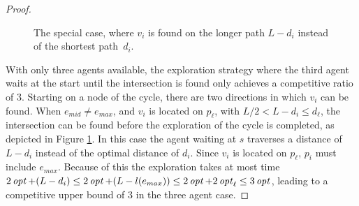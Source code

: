 \begin{proof}
\begin{figure}[H]
    \begin{center}
    \end{center}
    \caption[ALE at intersection]{The special case, where $v_i$ is found on the longer path $L-d_i$ instead of the shortest path~$d_i$.}
    \label{Case5ALE}
\end{figure}

With only three agents available, the exploration strategy where the third agent waits at the start until the intersection is found only achieves a competitive ratio of $3$. Starting on a node of the cycle, there are two directions in which $v_i$ can be found. When $e_{mid} \neq e_{max}$, and $v_i$ is located on $p_\ell$,
with $L/2 < L - d_i \leq d_\ell$, the intersection can be found before the exploration of the cycle is completed, as depicted in Figure \ref{Case5ALE}. In this case the agent waiting at $s$ traverses
a distance of $L - d_i$ instead of the optimal distance of $d_i$. Since $v_i$ is located on $p_\ell$, $p_i$ must include $e_{max}$. Because of this
the exploration takes at most time $2\mathop{\mathit{opt}}\nolimits + (L - d_i) \leq 2\mathop{\mathit{opt}}\nolimits + (L - l(e_{max})) \leq 2\mathop{\mathit{opt}}\nolimits + 2\mathop{\mathit{opt}}\nolimits_\ell \leq 3\mathop{\mathit{opt}}\nolimits$, leading to a competitive upper bound of $3$ in the three agent case.
\end{proof}

